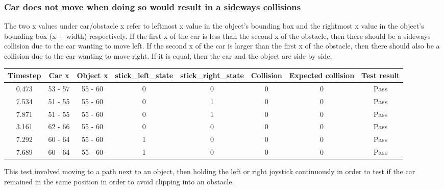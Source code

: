 \documentclass{article}
\begin{document}
\subsubsection*{Car does not move when doing so would result in a sideways collisions}
The two x values under car/obstacle x refer to leftmost x value in the object's bounding box and the rightmost x value in the object's bounding box (x + width) respectively. If the first x of the car is less than the second x of the obstacle, then there should be a sideways collision due to the car wanting to move left. If the second x of the car is larger than the first x of the obstacle, then there should also be a collision due to the car wanting to move right. If it is equal, then the car and the object are side by side.
\begin{center}
\begin{tabular}{ c c c c c c c c }
Timestep	& Car x 	& Object x 	& stick\_left\_state	& stick\_right\_state	& Collision 	& Expected collision	& Test result	\\ \hline
0.473		& 53 - 57	& 55 - 60	& 0			& 0				& 0		& 0 			& Pass	\\
7.534		& 51 - 55	& 55 - 60	& 0			& 1				& 0		& 0 			& Pass	\\
7.871		& 51 - 55	& 55 - 60	& 0			& 1				& 0		& 0 			& Pass	\\
3.161		& 62 - 66	& 55 - 60	& 0			& 0				& 0 		& 0 			& Pass	\\
7.292		& 60 - 64	& 55 - 60	& 1			& 0				& 0		& 0			& Pass 	\\
7.689		& 60 - 64	& 55 - 60	& 1			& 0				& 0		& 0			& Pass 	\\
\end{tabular}
\end{center}
This test involved moving to a path next to an object, then holding the left or right joystick continuously in order to test if the car remained in the same position in order to avoid clipping into an obstacle.
\end{document}
